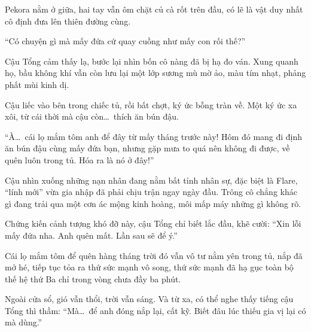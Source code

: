 \documentclass[../main.tex]{subfiles}
\begin{document}
Pekora nằm ở giữa, hai tay vẫn ôm chặt củ cà rốt trên đầu, có lẽ là vật duy nhất cô định đưa lên thiên đường cùng.

``Có chuyện gì mà mấy đứa cứ quay cuồng như mấy con rối thế?''

Cậu Tổng cảm thấy lạ, bước lại nhìn bốn cô nàng đã bị hạ đo ván. Xung quanh họ, bầu không khí vẫn còn lưu lại một lớp sương mù mờ ảo, màu tím nhạt, phảng phất mùi kinh dị.

Cậu liếc vào bên trong chiếc tủ, rồi bất chợt, ký ức bỗng tràn về. Một ký ức xa xôi, từ cái thời mà cậu còn\dots\ thích ăn bún đậu.

``À\dots\ cái lọ mắm tôm anh để đây từ mấy tháng trước này! Hôm đó mang đi định ăn bún đậu cùng mấy đứa bạn, nhưng gặp mưa to quá nên không đi được, về quên luôn trong tủ. Hóa ra là nó ở đây!''

Cậu nhìn xuống những nạn nhân đang nằm bất tỉnh nhân sự, đặc biệt là Flare, ``lính mới'' vừa gia nhập đã phải chịu trận ngay ngày đầu. Trông cô chẳng khác gì đang trải qua một cơn ác mộng kinh hoàng, môi mấp máy những gì không rõ.

Chứng kiến cảnh tượng khó đỡ này, cậu Tổng chỉ biết lắc đầu, khẽ cười: ``Xin lỗi mấy đứa nha. Anh quên mất. Lần sau sẽ để ý.''

Cái lọ mắm tôm để quên hàng tháng trời đó vẫn vô tư nằm yên trong tủ, nắp đã mở hé, tiếp tục tỏa ra thứ sức mạnh vô song, thứ sức mạnh đã hạ gục toàn bộ thế hệ thứ Ba chỉ trong vòng chưa đầy ba phút.

Ngoài cửa sổ, gió vẫn thổi, trời vẫn sáng. Và từ xa, có thể nghe thấy tiếng cậu Tổng thì thầm: ``Mà\dots\ để anh đóng nắp lại, cất kỹ. Biết đâu lúc thiếu gia vị lại có mà dùng.''
\end{document}
